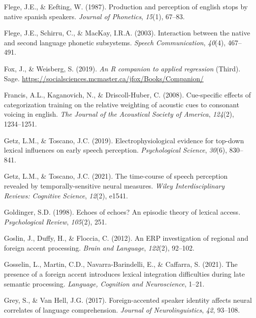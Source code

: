 \documentclass[
  12pt,
  twoside]{article}
\newlength{\cslhangindent}
\newlength{\cslentryspacingunit} %
\newenvironment{CSLReferences}[2] %
 {%
  \setlength{\parindent}{0pt}
  \ifodd #1
  \let\oldpar\par
  \def\par{\hangindent=\cslhangindent\oldpar}
  \fi
  \setlength{\parskip}{#2\cslentryspacingunit}
 }%
 {}
\begin{document}
\begin{CSLReferences}{1}{0}
\leavevmode{}%
Flege, J.E., \& Eefting, W. (1987). Production and perception of english stops by native spanish speakers. \emph{Journal of Phonetics}, \emph{15}(1), 67--83.

\leavevmode{}%
Flege, J.E., Schirru, C., \& MacKay, I.R.A. (2003). Interaction between the native and second language phonetic subsystems. \emph{Speech Communication}, \emph{40}(4), 467--491.

\leavevmode{}%
Fox, J., \& Weisberg, S. (2019). \emph{An {R} companion to applied regression} (Third). Sage. \url{https://socialsciences.mcmaster.ca/jfox/Books/Companion/}

\leavevmode{}%
Francis, A.L., Kaganovich, N., \& Driscoll-Huber, C. (2008). Cue-specific effects of categorization training on the relative weighting of acoustic cues to consonant voicing in english. \emph{The Journal of the Acoustical Society of America}, \emph{124}(2), 1234--1251.

\leavevmode{}%
Getz, L.M., \& Toscano, J.C. (2019). Electrophysiological evidence for top-down lexical influences on early speech perception. \emph{Psychological Science}, \emph{30}(6), 830--841.

\leavevmode{}%
Getz, L.M., \& Toscano, J.C. (2021). The time-course of speech perception revealed by temporally-sensitive neural measures. \emph{Wiley Interdisciplinary Reviews: Cognitive Science}, \emph{12}(2), e1541.

\leavevmode{}%
Goldinger, S.D. (1998). Echoes of echoes? An episodic theory of lexical access. \emph{Psychological Review}, \emph{105}(2), 251.

\leavevmode{}%
Goslin, J., Duffy, H., \& Floccia, C. (2012). An {ERP} investigation of regional and foreign accent processing. \emph{Brain and Language}, \emph{122}(2), 92--102.

\leavevmode{}%
Gosselin, L., Martin, C.D., Navarra-Barindelli, E., \& Caffarra, S. (2021). The presence of a foreign accent introduces lexical integration difficulties during late semantic processing. \emph{Language, Cognition and Neuroscience}, 1--21.

\leavevmode{}%
Grey, S., \& Van Hell, J.G. (2017). Foreign-accented speaker identity affects neural correlates of language comprehension. \emph{Journal of Neurolinguistics}, \emph{42}, 93--108.


\end{CSLReferences}
\end{document}
